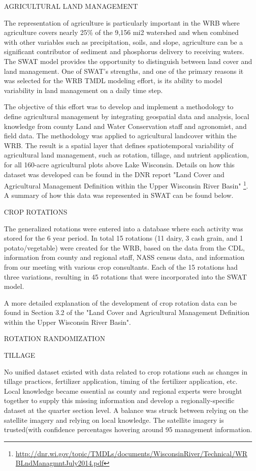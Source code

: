 AGRICULTURAL LAND MANAGEMENT

The representation of agriculture is particularly important in the WRB where agriculture covers nearly
25\% of the 9,156 mi2 watershed and when combined with other variables such as precipitation, soils,
and slope, agriculture can be a significant contributor of sediment and phosphorus delivery to receiving waters.  The SWAT model provides the opportunity to distinguish between land cover and land management.  One of SWAT’s strengths, and one of the primary reasons it was selected for the WRB TMDL modeling effort, is its ability to model variability in land management on a daily time step.

The objective of this effort was to develop and implement a methodology to define agricultural management by integrating geospatial data and analysis, local knowledge from county Land and Water Conservation staff and agronomist, and field data. The methodology was applied to agricultural landcover within the WRB. The result is a spatial layer that defines spatiotemporal variability of agricultural land management, such as rotation, tillage, and nutrient application, for all 160-acre agricultural plots above Lake Wisconsin.  Details on how this dataset was developed can be found in the DNR report "Land Cover and Agricultural Management Definition within the Upper Wisconsin River Basin" \footnote{\url{http://dnr.wi.gov/topic/TMDLs/documents/WisconsinRiver/Technical/WRBLndManagmntJuly2014.pdf}}.  A summary of how this data was represented in SWAT can be found below.

CROP ROTATIONS

The generalized rotations were entered into a database where each activity was stored for the 6 year
period. In total 15 rotations (11 dairy, 3 cash grain, and 1 potato/vegetable) were created for the WRB,
based on the data from the CDL, information from county and regional staff, NASS census data, and
information from our meeting with various crop consultants. Each of the 15 rotations had three
variations, resulting in 45 rotations that were incorporated into the SWAT model.

A more detailed explanation of the development of crop rotation data can be found in Section 3.2 of the "Land Cover and Agricultural Management Definition within the Upper Wisconsin River Basin".

ROTATION RANDOMIZATION


TILLAGE

No unified dataset existed with data related to crop rotations such as changes in tillage practices, fertilizer application, timing of the fertilizer application, etc.  Local knowledge became essential as county and regional experts were brought together to supply this missing information and develop a regionally-specific dataset at the quarter section level. A balance was struck between relying on the satellite imagery and relying on local knowledge. The satellite imagery is trusted(with confidence percentages hovering around 95%
management information.  

